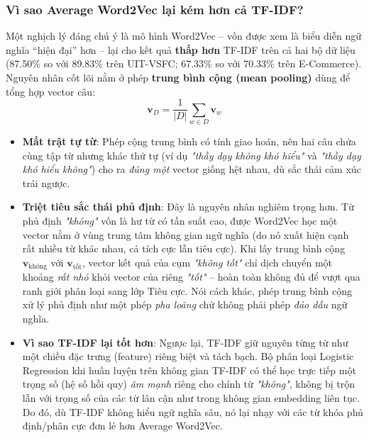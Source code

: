 \documentclass[12pt,a4paper]{article}
\begin{document}
\subsubsection{Vì sao Average Word2Vec lại kém hơn cả TF-IDF?}\label{sec:discuss_avgw2v_vs_tfidf}
Một nghịch lý đáng chú ý là mô hình Word2Vec -- vốn được xem là biểu diễn ngữ nghĩa ``hiện đại'' hơn -- lại cho kết quả \textbf{thấp hơn} TF-IDF trên cả hai bộ dữ liệu (87.50\% so với 89.83\% trên UIT-VSFC; 67.33\% so với 70.33\% trên E-Commerce). Nguyên nhân cốt lõi nằm ở phép \textbf{trung bình cộng (mean pooling)} dùng để tổng hợp vector câu:
\begin{equation}
    \mathbf{v}_D = \frac{1}{|D|} \sum_{w \in D} \mathbf{v}_w
\end{equation}
\begin{itemize}[leftmargin=1.0cm, itemsep=2pt]
    \item[--] \textbf{Mất trật tự từ}: Phép cộng trung bình có tính giao hoán, nên hai câu chứa cùng tập từ nhưng khác thứ tự (ví dụ \textit{"thầy dạy không khó hiểu"} và \textit{"thầy dạy khó hiểu không"}) cho ra \textit{đúng một} vector giống hệt nhau, dù sắc thái cảm xúc trái ngược.
    \item[--] \textbf{Triệt tiêu sắc thái phủ định}: Đây là nguyên nhân nghiêm trọng hơn. Từ phủ định \textit{"không"} vốn là hư từ có tần suất cao, được Word2Vec học một vector nằm ở vùng trung tâm không gian ngữ nghĩa (do nó xuất hiện cạnh rất nhiều từ khác nhau, cả tích cực lẫn tiêu cực). Khi lấy trung bình cộng $\mathbf{v}_{\text{không}}$ với $\mathbf{v}_{\text{tốt}}$, vector kết quả của cụm \textit{"không tốt"} chỉ dịch chuyển một khoảng \textit{rất nhỏ} khỏi vector của riêng \textit{"tốt"} -- hoàn toàn không đủ để vượt qua ranh giới phân loại sang lớp Tiêu cực. Nói cách khác, phép trung bình cộng xử lý phủ định như một phép \textit{pha loãng} chứ không phải phép \textit{đảo dấu} ngữ nghĩa.
    \item[--] \textbf{Vì sao TF-IDF lại tốt hơn}: Ngược lại, TF-IDF giữ nguyên từng từ như một chiều đặc trưng (feature) riêng biệt và tách bạch. Bộ phân loại Logistic Regression khi huấn luyện trên không gian TF-IDF có thể học trực tiếp một trọng số (hệ số hồi quy) \textit{âm mạnh} riêng cho chính từ \textit{"không"}, không bị trộn lẫn với trọng số của các từ lân cận như trong không gian embedding liên tục. Do đó, dù TF-IDF không hiểu ngữ nghĩa sâu, nó lại nhạy với các từ khóa phủ định/phân cực đơn lẻ hơn Average Word2Vec.
\end{itemize}
\end{document}

